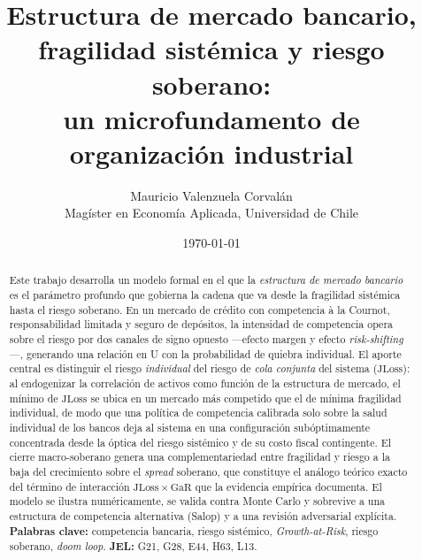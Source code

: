 \documentclass[12pt,letterpaper]{article}
\title{Estructura de mercado bancario, fragilidad sistémica y riesgo soberano:\\
un microfundamento de organización industrial}
\author{Mauricio Valenzuela Corvalán\\[2pt]
\small Magíster en Economía Aplicada, Universidad de Chile}
\date{\today}
\newcommand{\JLoss}{\mathrm{JLoss}}
\newcommand{\GaR}{\mathrm{GaR}}
\newcommand{\1}{\mathbf{1}}
\theoremstyle{plain}
\theoremstyle{definition}
\begin{document}
\maketitle

\begin{abstract}
\noindent
Este trabajo desarrolla un modelo formal en el que la \textit{estructura de mercado
bancario} es el parámetro profundo que gobierna la cadena que va desde la fragilidad
sistémica hasta el riesgo soberano. En un mercado de crédito con competencia à la
Cournot, responsabilidad limitada y seguro de depósitos, la intensidad de competencia
opera sobre el riesgo por dos canales de signo opuesto —efecto margen y efecto
\textit{risk-shifting}—, generando una relación en U con la probabilidad de quiebra
individual. El aporte central es distinguir el riesgo \emph{individual} del riesgo de
\emph{cola conjunta} del sistema ($\JLoss$): al endogenizar la correlación de activos
como función de la estructura de mercado, el mínimo de $\JLoss$ se ubica en un mercado
más competido que el de mínima fragilidad individual, de modo que una política de
competencia calibrada solo sobre la salud individual de los bancos deja al sistema en
una configuración subóptimamente concentrada desde la óptica del riesgo sistémico y de
su costo fiscal contingente. El cierre macro-soberano genera una complementariedad
entre fragilidad y riesgo a la baja del crecimiento sobre el \textit{spread} soberano,
que constituye el análogo teórico exacto del término de interacción $\JLoss\times\GaR$
que la evidencia empírica documenta. El modelo se ilustra numéricamente, se valida
contra Monte Carlo y sobrevive a una estructura de competencia alternativa (Salop) y a
una revisión adversarial explícita.\\[4pt]
\noindent\textbf{Palabras clave:} competencia bancaria, riesgo sistémico,
\textit{Growth-at-Risk}, riesgo soberano, \textit{doom loop}.\quad
\textbf{JEL:} G21, G28, E44, H63, L13.
\end{abstract}



\appendix

\end{document}
